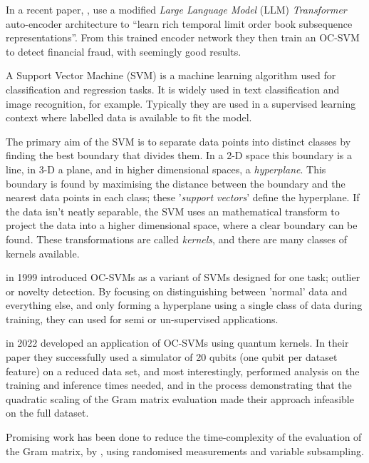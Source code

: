 In a recent paper, , \citeauthor{Poutre:2024} \cite{Poutre:2024} use a modified 
\emph{Large Language Model} (LLM) \emph{Transformer} auto-encoder architecture to 
\enquote{learn rich temporal limit order book subsequence representations}.  
From this trained encoder network they then train an OC-SVM to detect financial fraud, with seemingly good results.

A Support Vector Machine (SVM) is a machine learning algorithm used for classification and regression tasks.  
It is widely used in text classification and image recognition, for example.
Typically they are used in a supervised learning context where labelled data is available to fit the model.

The primary aim of the SVM is to separate data points into distinct classes by finding the best boundary that divides them.
In a 2-D space this boundary is a line, in 3-D a plane, and in higher dimensional spaces, a \emph{hyperplane}.
This boundary is found by maximising the distance between the boundary and the nearest data points in each class;
these '\emph{support vectors}' define the hyperplane. 
If the data isn't neatly separable, 
the SVM uses an mathematical transform to project the data into a higher dimensional space, 
where a clear boundary can be found.
These transformations are called \emph{kernels}, and there are many classes of kernels available.

\citeauthor{Scholkopf:1999} in 1999 \cite{Scholkopf:1999} introduced OC-SVMs as a variant of SVMs designed for one task;
outlier or novelty detection.
By focusing on distinguishing between 'normal' data and everything else, 
and only forming a hyperplane using a single class of data during training, 
they can used for semi or un-supervised applications.

\citeauthor{Kyriienko:2022} \cite{Kyriienko:2022} in 2022 developed an application of OC-SVMs using quantum kernels.
In their paper they successfully used a simulator of 20 qubits (one qubit per dataset feature)
on a reduced data set, and most interestingly, performed analysis on the training and inference times needed, 
and in the process demonstrating that the quadratic scaling of the Gram matrix evaluation 
made their approach infeasible on the full dataset.

Promising work has been done to reduce the time-complexity of the evaluation of the Gram matrix, 
by \citeauthor{Kolle:2023} \cite{Kolle:2023}, using randomised measurements and variable subsampling.

